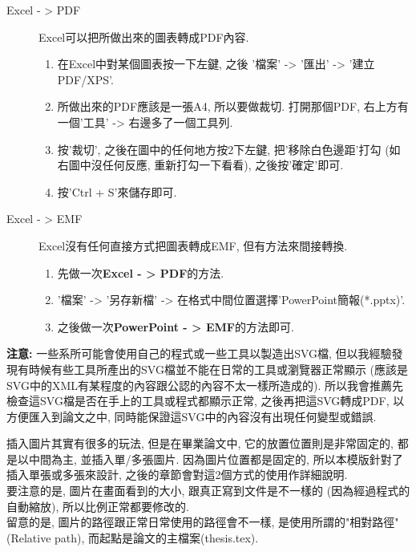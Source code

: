 \begin{description}
  \item[Excel - > PDF] Excel可以把所做出來的圖表轉成PDF內容. 
    \begin{enumerate}
      \item 在Excel中對某個圖表按一下左鍵, 之後 '檔案' -> '匯出' -> '建立PDF/XPS'.
      \item 所做出來的PDF應該是一張A4, 所以要做裁切. 打開那個PDF, 右上方有一個'工具' -> 右邊多了一個工具列.
      \item 按'裁切', 之後在圖中的任何地方按2下左鍵, 把'移除白色邊距'打勾 (如右圖中沒任何反應, 重新打勾一下看看), 之後按'確定'即可.
      \item 按'Ctrl + S'來儲存即可.
    \end{enumerate}

  \item[Excel - > EMF] Excel沒有任何直接方式把圖表轉成EMF, 但有方法來間接轉換.
    \begin{enumerate}
      \item 先做一次\textbf{Excel - > PDF}的方法.
      \item '檔案' -> '另存新檔' -> 在格式中間位置選擇'PowerPoint簡報(*.pptx)'.
      \item 之後做一次\textbf{PowerPoint - > EMF}的方法即可.
    \end{enumerate}
\end{description}

\noindent \textbf{注意:} 一些系所可能會使用自己的程式或一些工具以製造出SVG檔, 但以我經驗發現有時候有些工具所產出的SVG檔並不能在日常的工具或瀏覽器正常顯示 (應該是SVG中的XML有某程度的內容跟公認的內容不太一樣所造成的). 所以我會推薦先檢查這SVG檔是否在手上的工具或程式都顯示正常, 之後再把這SVG轉成PDF, 以方便匯入到論文之中, 同時能保證這SVG中的內容沒有出現任何變型或錯誤.

\newpage
{}

插入圖片其實有很多的玩法, 但是在畢業論文中, 它的放置位置則是非常固定的, 都是以中間為主, 並插入單/多張圖片. 因為圖片位置都是固定的, 所以本模版針對了插入單張或多張來設計, 之後的章節會對這2個方式的使用作詳細說明.\\

要注意的是, 圖片在畫面看到的大小, 跟真正寫到文件是不一樣的 (因為經過程式的自動縮放), 所以比例正常都要修改的.\\

留意的是, 圖片的路徑跟正常日常使用的路徑會不一樣, 是使用所謂的"相對路徑" (Relative path), 而起點是論文的主檔案(thesis.tex).\\

